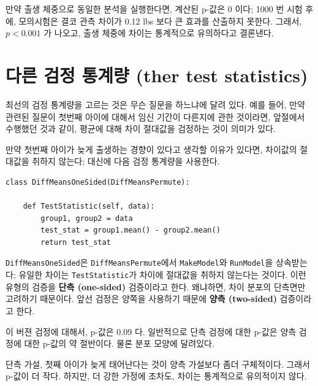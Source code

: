 만약 출생 체중으로 동일한 분석을 실행한다면, 계산된 p-값은 0 이다; 1000 번 시험 후에, 모의시험은 결코 관측 차이가 0.12 lbs 보다 큰 효과를 산출하지 못한다.
그래서, $p < 0.001$ 가 나오고, 출생 체중에 차이는 통계적으로 유의하다고 결론낸다. 



\section{다른 검정 통계량 (ther test statistics)}

최선의 검정 통계량을 고르는 것은 무슨 질문을 하느냐에 달려 있다.
예를 들어, 만약 관련된 질문이 첫번째 아이에 대해서 임신 기간이 다른지에 관한 것이라면, 앞절에서 수행했던 것과 같이, 평균에 대해 차이 절대값을 검정하는 것이 의미가 있다.


만약 첫번째 아이가 늦게 출생하는 경향이 있다고 생각할 이유가 있다면, 차이값의 절대값을 취하지 않는다; 대신에 다음 검정 통계량을 사용한다.

\begin{verbatim}
class DiffMeansOneSided(DiffMeansPermute):

    def TestStatistic(self, data):
        group1, group2 = data
        test_stat = group1.mean() - group2.mean()
        return test_stat
\end{verbatim}

{\tt DiffMeansOneSided}은 {\tt DiffMeansPermute}에서 {\tt MakeModel}와 {\tt RunModel}을 상속받는다; 유일한 차이는 {\tt TestStatistic}가 
차이에 절대값을 취하지 않는다는 것이다.
이런 유형의 검증을 {\bf 단측 (one-sided)} 검증이라고 한다. 왜냐하면,
차이 분포의 단측면만 고려하기 때문이다. 앞선 검정은 양쪽을 사용하기 때문에 {\bf 양측 (two-sided)} 검증이라고 한다.

이 버젼 검정에 대해서, p-값은 0.09 다. 일반적으로 단측 검정에 대한 p-값은 양측 검정에 대한 p-값의 약 절반이다. 물론 분포 모양에 달려있다.


단측 가설, 첫째 아이가 늦게 태어난다는 것이 양측 가설보다 좀더 구체적이다. 그래서 p-값이 더 작다. 하지만, 더 강한 가정에 조차도, 차이는 통계적으로 유의적이지 않다.



